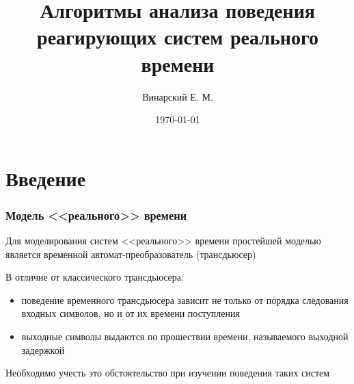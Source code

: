 \documentclass{beamer}
\title[]{Алгоритмы анализа поведения реагирующих систем реального времени}
\author{Винарский Е. М.}
\institute[ВМК МГУ] %
{
\medskip
\textit{Московский государственный университет им. М.В.Ломоносова
\newline
Факультет вычислительной математики и кибернетики
\newline
Кафедра математической кибернетики
} \\

Научный руководитель: Захаров Владимир Анатольевич
}
\date{\today} %
\begin{document}
\begin{frame}
\titlepage %
\end{frame}






\section{Введение}

\begin{frame}
\frametitle{Модель <<реального>> времени}


Для моделирования систем <<реального>> времени простейшей моделью является временной автомат-преобразователь (трансдьюсер)

В отличие от классического трансдьюсера:
\begin{itemize}
    \item поведение временного трансдьюсера зависит не только от порядка следования входных символов, но и от их времени поступления
    
    \item выходные символы выдаются по прошествии времени, называемого выходной задержкой
\end{itemize}

Необходимо учесть это обстоятельство при изучении поведения таких систем

\end{frame}
\end{document}
